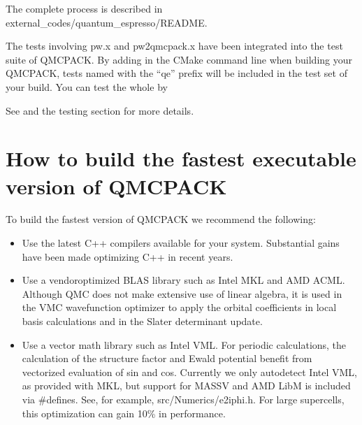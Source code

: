 \documentclass[letterpaper,10pt,english]{sphinxmanual}
\begin{document}
The complete process is described in external\_codes/quantum\_espresso/README.

The tests involving pw.x and pw2qmcpack.x have been integrated into the test suite of QMCPACK.
By adding  in the CMake command line when building your QMCPACK,
tests named with the “qe\sphinxhyphen{}” prefix will be included in the test set of your build.
You can test the whole  by

\begin{sphinxVerbatim}[commandchars=\\\{\}]
  
\end{sphinxVerbatim}

See {\hyperref[\detokenize{installation:integtestqe}]{}} and the testing section for more details.


\section{How to build the fastest executable version of QMCPACK}
\label{\detokenize{installation:how-to-build-the-fastest-executable-version-of-qmcpack}}\label{\detokenize{installation:buildperformance}}
To build the fastest version of QMCPACK we recommend the following:
\begin{itemize}
\item {} 
Use the latest C++ compilers available for your
system. Substantial gains have been made optimizing C++ in recent
years.

\item {} 
Use a vendor\sphinxhyphen{}optimized BLAS library such as Intel MKL and AMD ACML. Although
QMC does not make extensive use of linear algebra, it is used in the
VMC wavefunction optimizer to apply the orbital coefficients in local basis
calculations and in the Slater determinant update.

\item {} 
Use a vector math library such as Intel VML.  For periodic
calculations, the calculation of the structure factor and Ewald
potential benefit from vectorized evaluation of sin and
cos. Currently we only autodetect Intel VML, as provided with MKL,
but support for MASSV and AMD LibM is included via \#defines. See,
for example, src/Numerics/e2iphi.h. For
large supercells, this optimization can gain 10\% in performance.

\end{itemize}
\end{document}
